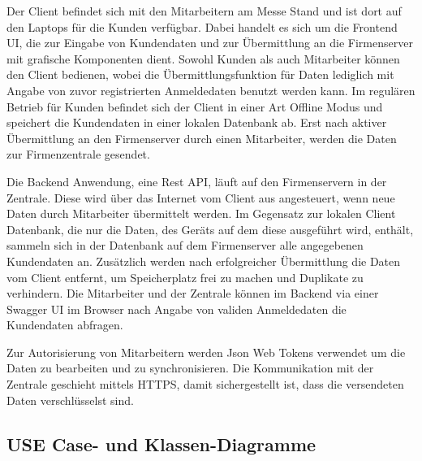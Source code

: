 Der Client befindet sich mit den Mitarbeitern am Messe Stand und ist dort auf den Laptops für die Kunden verfügbar. Dabei handelt es sich um die Frontend UI, die zur Eingabe von Kundendaten und zur Übermittlung an die Firmenserver mit grafische Komponenten dient. Sowohl Kunden als auch Mitarbeiter können den Client bedienen, wobei die Übermittlungsfunktion für Daten lediglich mit Angabe von zuvor registrierten Anmeldedaten benutzt werden kann. Im regulären Betrieb für Kunden befindet sich der Client in einer Art Offline Modus und speichert die Kundendaten in einer lokalen Datenbank ab. Erst nach aktiver Übermittlung an den Firmenserver durch einen Mitarbeiter, werden die Daten zur Firmenzentrale gesendet.

Die Backend Anwendung, eine Rest API, läuft auf den Firmenservern in der Zentrale. Diese wird über das Internet vom Client aus angesteuert, wenn neue Daten durch Mitarbeiter übermittelt werden. Im Gegensatz zur lokalen Client Datenbank, die nur die Daten, des Geräts auf dem diese ausgeführt wird, enthält, sammeln sich in der Datenbank auf dem Firmenserver alle angegebenen Kundendaten an. Zusätzlich werden nach erfolgreicher Übermittlung die Daten vom Client entfernt, um Speicherplatz frei zu machen und Duplikate zu verhindern. Die Mitarbeiter und der Zentrale können im Backend via einer Swagger UI im Browser nach Angabe von validen Anmeldedaten die Kundendaten abfragen.

Zur Autorisierung von Mitarbeitern werden Json Web Tokens verwendet um die Daten zu bearbeiten und zu synchronisieren. Die Kommunikation mit der Zentrale geschieht mittels HTTPS, damit sichergestellt ist, dass die versendeten Daten verschlüsselst sind.

\newpage
\subsection{USE Case- und Klassen-Diagramme}

